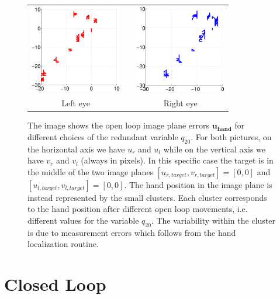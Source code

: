 \begin{figure}
  \begin{center}
	\begin{tabular}{ccc}
	  \parbox{40mm}{\includegraphics[width=40mm]{Figure/LeftEyeOpenLoop.eps}}  & \hspace{2cm} &
	  \parbox{40mm}{\includegraphics[width=40mm]{Figure/RightEyeOpenLoop.eps}}
	  \\
	  Left eye & \hspace{2cm} & Right eye
  \end{tabular}
\end{center}
\caption{The image shows the open loop image plane errors $\mathbf {u_{hand}}$ for different
choices of the redundant variable $q_{20}$. For both pictures, on the horizontal axis 
we have $u_r$ and $u_l$ while on the vertical axis we have $v_r$ and $v_l$ (always in pixels).
In this specific case the target is in the middle of the two image planes 
$[u_{r, target}, v_{r, target}] =[0,0]$ and $[u_{l, target}, v_{l, target}]=[0,0]$.
The hand position in the image plane is instead represented 
by the small clusters.  Each cluster corresponds to the hand position 
after different open loop movements, i.e. different values for the variable $q_{20}$.
The variability within the cluster is due to measurement errors which follows from the hand localization routine.}\label{Fig:ImagePlaneOpenLoopErrors}
  \end{figure}

\section{Closed Loop}

